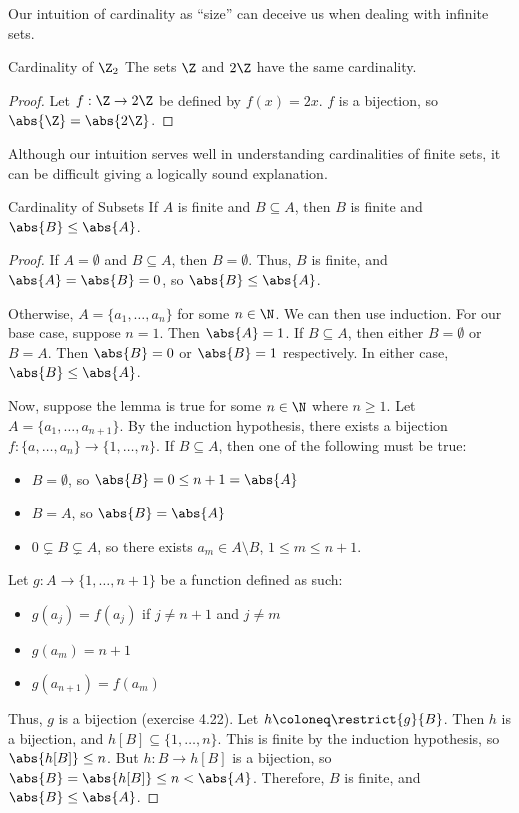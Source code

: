 \documentclass[letterpaper,12pt]{report}
\begin{document}
Our intuition of cardinality as ``size'' can deceive us when dealing with infinite sets.
\begin{exbox}{Cardinality of $\Z_2$}{}
    The sets $\Z$ and $2\Z$ have the same cardinality.
    \tcblower
    \begin{proof}
        Let $f : \Z \to 2\Z$ be defined by $f(x) = 2x$. $f$ is a bijection, so $\abs{\Z} = \abs{2\Z}$.
    \end{proof}
\end{exbox}

Although our intuition serves well in understanding cardinalities of finite sets, it can be difficult giving a logically sound explanation.

\begin{exbox}{Cardinality of Subsets}{}
    If $A$ is finite and $B \subseteq A$, then $B$ is finite and $\abs{B} \leq \abs{A}$.
    \tcblower
    \begin{proof}
        If $A = \emptyset$ and $B \subseteq A$, then $B = \emptyset$. Thus, $B$ is finite, and $\abs{A} = \abs{B} = 0$, so $\abs{B} \leq \abs{A}$.

        Otherwise, $A = \{ a_1, \ldots, a_n \}$ for some $n \in \N$. We can then use induction. For our base case, suppose $n=1$. Then $\abs{A} = 1$. If $B \subseteq A$, then either $B = \emptyset$ or $B = A$. Then $\abs{B} = 0$ or $\abs{B} = 1$ respectively. In either case, $\abs{B} \leq \abs{A}$.

        Now, suppose the lemma is true for some $n \in \N$ where $n \geq 1$. Let $A = \{ a_1, \ldots, a_{n+1} \}$. By the induction hypothesis, there exists a bijection $f : \{a, \ldots, a_n\} \to \{1, \ldots, n\}$. If $B \subseteq A$, then one of the following must be true:
        \begin{itemize}
            \item $B = \emptyset$, so $\abs{B} = 0 \leq n+1 = \abs{A}$
            \item $B = A$, so $\abs{B} = \abs{A}$
            \item $0 \subsetneq B \subsetneq A$, so there exists $a_m \in A \setminus B$, $1 \leq m \leq n + 1$.
        \end{itemize}
        Let $g : A \to \{ 1, \ldots, n+1 \}$ be a function defined as such:
        \begin{itemize}
            \item $g(a_j) = f(a_j)$ if $j \neq n+1$ and $j \neq m$
            \item $g(a_m) = n+1$
            \item $g(a_{n+1}) = f(a_m)$
        \end{itemize}
        Thus, $g$ is a bijection (exercise 4.22). Let $h \coloneq \restrict{g}{B}$. Then $h$ is a bijection, and $h[B] \subseteq \{ 1, \ldots, n \}$. This is finite by the induction hypothesis, so $\abs{h[B]} \leq n$. But $h : B \to h[B]$ is a bijection, so $\abs{B} = \abs{h[B]} \leq n < \abs{A}$. Therefore, $B$ is finite, and $\abs{B} \leq \abs{A}$.
    \end{proof}
\end{exbox}
\end{document}
